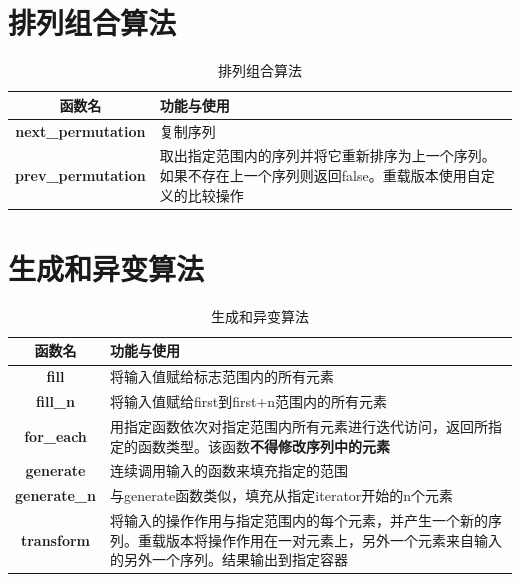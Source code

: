 \documentclass[UTF8,a4paper,12pt]{ctexbook}
\begin{document}
	\section{排列组合算法}
	\begin{table}[H]
		\centering
		\caption{排列组合算法}
		\begin{tabular}{c|m{13cm}}
			\hline 
			函数名 & 功能与使用\\
			\hline
			\textbf{next\_permutation}	& 复制序列\\
			\hline 
			\textbf{prev\_permutation} 	& 取出指定范围内的序列并将它重新排序为上一个序列。如果不存在上一个序列则返回false。重载版本使用自定义的比较操作\\
			\hline 
		\end{tabular}
	\end{table}
	
	\section{生成和异变算法}
	\begin{table}[H]
		\centering
		\caption{生成和异变算法}
		\begin{tabular}{c|m{15cm}}
			\hline 
			函数名 & 功能与使用\\
			\hline
			\textbf{fill}	& 将输入值赋给标志范围内的所有元素\\
			\hline 
			\textbf{fill\_n}  & 将输入值赋给first到first+n范围内的所有元素\\
			\hline 
			\textbf{for\_each}  & 用指定函数依次对指定范围内所有元素进行迭代访问，返回所指定的函数类型。该函数\textbf{不得修改序列中的元素}\\
			\hline 
			\textbf{generate}  & 连续调用输入的函数来填充指定的范围\\
			\hline 
			\textbf{generate\_n}  & 与generate函数类似，填充从指定iterator开始的n个元素\\
			\hline 
			\textbf{transform}	& 将输入的操作作用与指定范围内的每个元素，并产生一个新的序列。重载版本将操作作用在一对元素上，另外一个元素来自输入的另外一个序列。结果输出到指定容器\\
			\hline
		\end{tabular}
	\end{table}	
\end{document}
